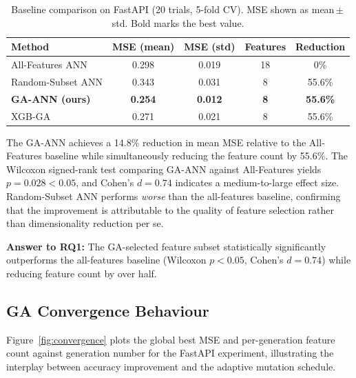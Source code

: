 \documentclass[11pt,a4paper]{article}
\begin{document}
\begin{table}[!htbp]
\centering
\caption{Baseline comparison on FastAPI (20 trials, 5-fold CV).
         MSE shown as mean\,$\pm$\,std. Bold marks the best value.}
\label{tab:baseline}
\renewcommand{\arraystretch}{1.2}
\begin{tabular}{@{}lcccc@{}}
\toprule
\textbf{Method} & \textbf{MSE (mean)} & \textbf{MSE (std)} &
\textbf{Features} & \textbf{Reduction} \\
\midrule
All-Features ANN & 0.298 & 0.019 & 18 & 0\% \\
Random-Subset ANN & 0.343 & 0.031 & 8  & 55.6\% \\
\textbf{GA-ANN (ours)} & \textbf{0.254} & \textbf{0.012} & \textbf{8} & \textbf{55.6\%} \\
XGB-GA & 0.271 & 0.021 & 8  & 55.6\% \\
\bottomrule
\end{tabular}
\end{table}

The GA-ANN achieves a 14.8\% reduction in mean MSE relative to the All-Features
baseline while simultaneously reducing the feature count by 55.6\%. The
Wilcoxon signed-rank test comparing GA-ANN against All-Features yields
$p = 0.028 < 0.05$, and Cohen's $d = 0.74$ indicates a medium-to-large
effect size. Random-Subset ANN performs \emph{worse} than the all-features
baseline, confirming that the improvement is attributable to the quality of
feature selection rather than dimensionality reduction per se.

\textbf{Answer to RQ1:} The GA-selected feature subset statistically
significantly outperforms the all-features baseline (Wilcoxon $p < 0.05$,
Cohen's $d = 0.74$) while reducing feature count by over half.

\subsection{GA Convergence Behaviour}

Figure~\ref{fig:convergence} plots the global best MSE and per-generation
feature count against generation number for the FastAPI experiment,
illustrating the interplay between accuracy improvement and the adaptive
mutation schedule.
\end{document}
